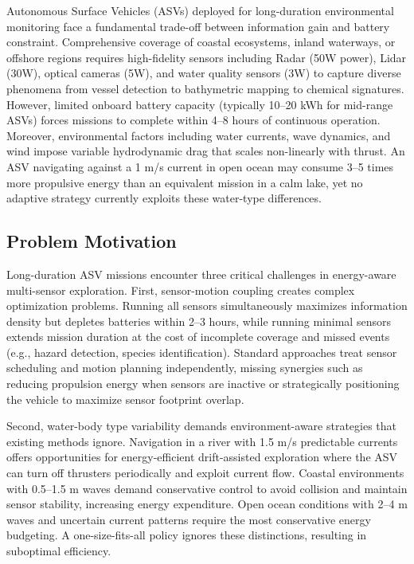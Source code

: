 Autonomous Surface Vehicles (ASVs) deployed for long-duration environmental monitoring face a fundamental trade-off between information gain and battery constraint. Comprehensive coverage of coastal ecosystems, inland waterways, or offshore regions requires high-fidelity sensors including Radar (50W power), Lidar (30W), optical cameras (5W), and water quality sensors (3W) to capture diverse phenomena from vessel detection to bathymetric mapping to chemical signatures. However, limited onboard battery capacity (typically 10--20 kWh for mid-range ASVs) forces missions to complete within 4--8 hours of continuous operation. Moreover, environmental factors including water currents, wave dynamics, and wind impose variable hydrodynamic drag that scales non-linearly with thrust. An ASV navigating against a 1 m/s current in open ocean may consume 3--5 times more propulsive energy than an equivalent mission in a calm lake, yet no adaptive strategy currently exploits these water-type differences.

\subsection{Problem Motivation}

Long-duration ASV missions encounter three critical challenges in energy-aware multi-sensor exploration. First, sensor-motion coupling creates complex optimization problems. Running all sensors simultaneously maximizes information density but depletes batteries within 2--3 hours, while running minimal sensors extends mission duration at the cost of incomplete coverage and missed events (e.g., hazard detection, species identification). Standard approaches treat sensor scheduling and motion planning independently, missing synergies such as reducing propulsion energy when sensors are inactive or strategically positioning the vehicle to maximize sensor footprint overlap.

Second, water-body type variability demands environment-aware strategies that existing methods ignore. Navigation in a river with 1.5 m/s predictable currents offers opportunities for energy-efficient drift-assisted exploration where the ASV can turn off thrusters periodically and exploit current flow. Coastal environments with 0.5--1.5 m waves demand conservative control to avoid collision and maintain sensor stability, increasing energy expenditure. Open ocean conditions with 2--4 m waves and uncertain current patterns require the most conservative energy budgeting. A one-size-fits-all policy ignores these distinctions, resulting in suboptimal efficiency.

